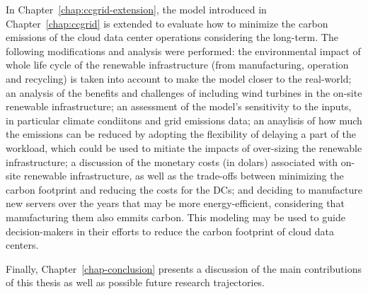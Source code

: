 In Chapter~\ref{chap:ccgrid-extension}, the model introduced in Chapter~\ref{chap:ccgrid} is extended to evaluate how to minimize the carbon emissions of the cloud data center operations considering the long-term. The following modifications and analysis were performed: the environmental impact of whole life cycle of the renewable infrastructure (from manufacturing, operation and recycling) is taken into account to make the model closer to the real-world; an analysis of the benefits and challenges of including wind turbines in the on-site renewable infrastructure; an assessment of the model's sensitivity to the inputs, in particular climate condiitons and grid emissions data; an anaylisis of how much the  emissions can be reduced by adopting the flexibility of delaying a part of the workload, which could be used to mitiate the impacts of over-sizing the renewable infrastructure; a discussion of the monetary costs (in dolars) associated with on-site renewable infrastructure, as well as the trade-offs between minimizing the carbon footprint and reducing the costs for the DCs; and deciding to manufacture new servers over the years that may be more energy-efficient, considering that manufacturing them also emmits carbon. This modeling may be used to guide decision-makers in their efforts to reduce the carbon footprint of cloud data centers.

Finally, Chapter~\ref{chap-conclusion} presents a discussion of the main contributions of this thesis as well as possible future research trajectories.